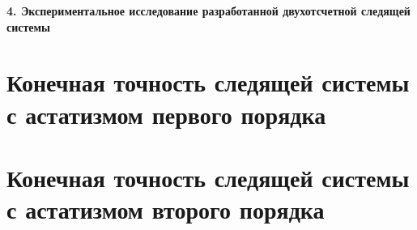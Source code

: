 \newpage
\begin{center}
  \textbf{\large 4. Экспериментальное исследование разработанной двухотсчетной следящей системы}
\end{center}

\section{Конечная точность следящей системы с астатизмом первого порядка}

\section{Конечная точность следящей системы с астатизмом второго порядка} %






